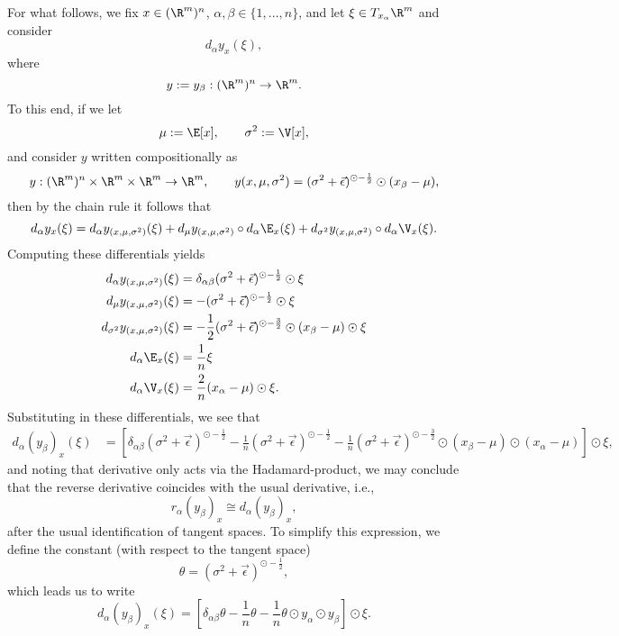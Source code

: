 For what follows, we fix $x\in(\R^m)^n$, $\alpha,\beta\in\{1,...,n\}$, and let $\xi\in T_{x_\alpha}\R^m$ and consider
$$d_\alpha y_x(\xi),$$
where
$$y:=y_\beta:(\R^m)^n\to\R^m.$$
To this end, if we let
$$\mu:=\E[x],\qquad\sigma^2:=\V[x],$$
and consider $y$ written compositionally as
$$y:(\R^m)^n\times\R^m\times\R^m\to\R^m,\qquad y(x,\mu,\sigma^2)=(\sigma^2+\vec{\epsilon})^{\odot-\frac{1}{2}}\odot(x_\beta-\mu),$$
then by the chain rule it follows that
$$d_\alpha y_x(\xi)=d_\alpha y_{(x,\mu,\sigma^2)}(\xi)+d_\mu y_{(x,\mu,\sigma^2)}\circ d_\alpha\E_x(\xi)+d_{\sigma^2}y_{(x,\mu,\sigma^2)}\circ d_\alpha\V_x(\xi).$$
Computing these differentials yields
\begin{align*}
	d_\alpha y_{(x,\mu,\sigma^2)}(\xi)&=\delta_{\alpha\beta}(\sigma^2+\vec{\epsilon})^{\odot-\frac{1}{2}}\odot\xi\\
	d_\mu y_{(x,\mu,\sigma^2)}(\xi)&=-(\sigma^2+\vec{\epsilon})^{\odot-\frac{1}{2}}\odot\xi\\
	d_{\sigma^2}y_{(x,\mu,\sigma^2)}(\xi)&=-\frac{1}{2}(\sigma^2+\vec{\epsilon})^{\odot-\frac{3}{2}}\odot(x_\beta-\mu)\odot\xi\\
	d_\alpha\E_x(\xi)&=\frac{1}{n}\xi\\
	d_\alpha\V_x(\xi)&=\frac{2}{n}(x_\alpha-\mu)\odot\xi.
\end{align*}
Substituting in these differentials, we see that
{\scriptsize
\begin{align*}
	d_\alpha (y_\beta)_x(\xi)&=\left[\delta_{\alpha\beta}(\sigma^2+\vec{\epsilon})^{\odot-\frac{1}{2}}-\frac{1}{n}(\sigma^2+\vec{\epsilon})^{\odot-\frac{1}{2}}-\frac{1}{n}(\sigma^2+\vec{\epsilon})^{\odot-\frac{3}{2}}\odot(x_\beta-\mu)\odot(x_\alpha-\mu)\right]\odot\xi,
\end{align*}
}
and noting that derivative only acts via the Hadamard-product, we may conclude that the reverse derivative coincides with the usual derivative, i.e.,
$$r_\alpha(y_\beta)_x\cong d_\alpha(y_\beta)_x,$$
after the usual identification of tangent spaces.  To simplify this expression, we define the constant (with respect to the tangent space)
$$\theta=(\sigma^2+\vec{\epsilon})^{\odot-\frac{1}{2}},$$
which leads us to write
$$d_\alpha(y_\beta)_x(\xi)=[\delta_{\alpha\beta}\theta-\frac{1}{n}\theta-\frac{1}{n}\theta\odot y_\alpha\odot y_\beta]\odot\xi.$$



